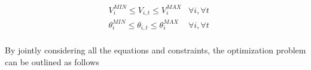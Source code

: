 \begin{subequations}
\begin{align*}
&V_{i}^{MIN} \leq V_{i,t} \leq V_{i}^{MAX} &\forall i,\forall t  \\
&\theta_{i}^{MIN} \leq \theta_{i,t}  \leq \theta_{i}^{MAX}  &\forall i,\forall t  \\ 
\end{align*}
\end{subequations}

\vspace{-6mm}

By jointly considering all the equations and constraints, the optimization problem can be outlined as follows

